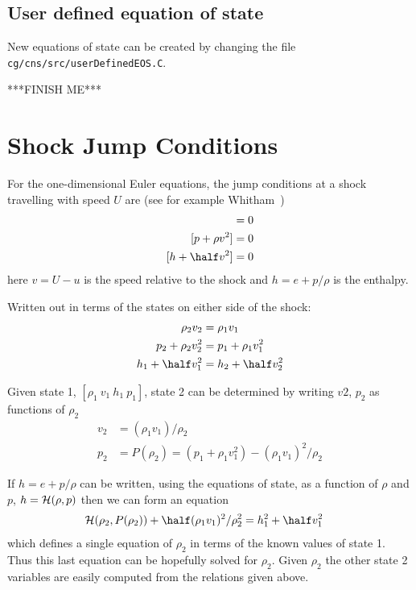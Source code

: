 \documentclass{article}
\begin{document}
\subsection{User defined equation of state} \label{sec:userDefinedEOS}

New equations of state can be created by changing the file {\tt cg/cns/src/userDefinedEOS.C}.

***FINISH ME***



\section{Shock Jump Conditions}

For the one-dimensional Euler equations, the jump conditions at a shock travelling with speed $U$
are (see for example Whitham~\cite{Whitham74})
\begin{align*}
          [\rho v] &= 0 \\
         [p+\rho v^2] &= 0   \\
         [h+ \half v^2] &= 0   
\end{align*}
here $v=U-u$ is the speed relative to the shock and $h=e+p/\rho$ is the enthalpy.

Written out in terms of the states on either side of the shock:
\begin{align*}
          \rho_2 v_2 &= \rho_1 v_1 \\
         p_2+\rho_2 v_2^2 &= p_1+\rho_1 v_1^2   \\
         h_1+\half v_1^2 &= h_2+\half v_2^2 
\end{align*}

Given state 1, $[\rho_1~ v_1~ h_1~ p_1]$,  state 2 can be determined by writing 
$v2$, $p_2$ as functions of $\rho_2$
\begin{align*}
  v_2 &= (\rho_1 v_1)/\rho_2 \\
  p_2 &= P(\rho_2) = (p_1+\rho_1 v_1^2) - (\rho_1 v_1)^2/\rho_2
\end{align*}

If $h=e+p/\rho$ can be written, using the equations of state, as a function of $\rho$ and $p$,
$h = {\mathcal H}(\rho,p)$ then we can form an equation
\begin{align*}
  \Hc(\rho_2,P(\rho_2)) + \half (\rho_1 v_1)^2/\rho_2^2 &= h_1^2 + \half v_1^2
\end{align*}
which defines a single equation of $\rho_2$ in terms of the known values of state 1. Thus this 
last equation can be hopefully solved 
for $\rho_2$. Given $\rho_2$ the other state 2 variables are easily computed from the relations
given above.
\end{document}
